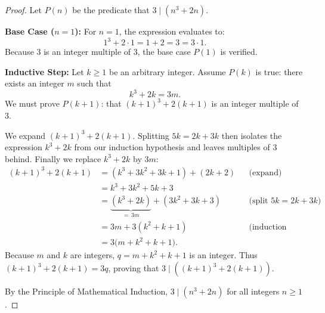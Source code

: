 \begin{proof}
Let $P(n)$ be the predicate that $3 \mid (n^3 + 2n)$.

\textbf{Base Case ($n = 1$):}
For $n = 1$, the expression evaluates to:
\[
1^3 + 2 \cdot 1 = 1 + 2 = 3 = 3 \cdot 1.
\]
Because $3$ is an integer multiple of $3$, the base case $P(1)$ is verified.

\textbf{Inductive Step:}
Let $k \ge 1$ be an arbitrary integer. Assume $P(k)$ is true: there exists an integer $m$ such that
\[
k^3 + 2k = 3m. \tag{Induction Hypothesis}
\]
We must prove $P(k+1)$: that $(k+1)^3 + 2(k+1)$ is an integer multiple of $3$.

We expand $(k+1)^3 + 2(k+1)$. Splitting $5k = 2k + 3k$ then isolates the expression $k^3 + 2k$ from our induction hypothesis and leaves multiples of $3$ behind. Finally we replace $k^3 + 2k$ by $3m$:
\begin{align*}
(k+1)^3 + 2(k+1)
&= (k^3 + 3k^2 + 3k + 1) + (2k + 2) && \text{(expand)} \\
&= k^3 + 3k^2 + 5k + 3 \\
&= \underbrace{(k^3 + 2k)}_{=\,3m} + (3k^2 + 3k + 3) && \text{(split } 5k = 2k + 3k\text{)} \\
&= 3m + 3(k^2 + k + 1) && \text{(induction hypothesis)} \\
&= 3\bigl(m + k^2 + k + 1\bigr).
\end{align*}
Because $m$ and $k$ are integers, $q = m + k^2 + k + 1$ is an integer. Thus $(k+1)^3 + 2(k+1) = 3q$, proving that $3 \mid ((k+1)^3 + 2(k+1))$.

By the Principle of Mathematical Induction, $3 \mid (n^3 + 2n)$ for all integers $n \ge 1$.
\end{proof}

